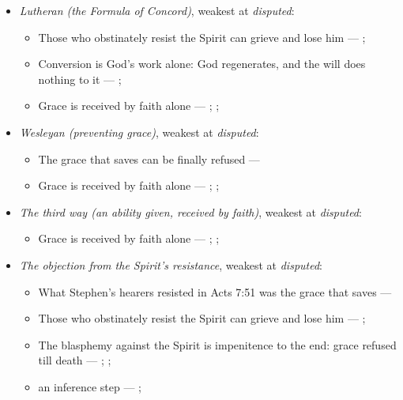 \documentclass[11pt]{article}
\begin{document}
\begin{itemize}
\begin{itemize}
\end{itemize}
\item \emph{Lutheran (the Formula of Concord)}, weakest at \emph{disputed}:
\begin{itemize}
\item Those who obstinately resist the Spirit can grieve and lose him --- \cite[Solid Declaration II.83]{concordia-triglotta-1921}; \cite[Solid Declaration XI.42]{concordia-triglotta-1921}
\item Conversion is God’s work alone: God regenerates, and the will does nothing to it --- \cite[Solid Declaration II.89]{concordia-triglotta-1921}; \cite[Solid Declaration II.90]{concordia-triglotta-1921}
\item Grace is received by faith alone --- \cite[Augsburg Confession IV.1–3]{concordia-triglotta-1921}; \cite[Sermon 1, III.1]{wesley-sermons-1872}; \cite[Trent, Session VI (1547), canon 9]{tanner-decrees-1990}
\end{itemize}
\item \emph{Wesleyan (preventing grace)}, weakest at \emph{disputed}:
\begin{itemize}
\item The grace that saves can be finally refused --- \cite[397]{wesley-works-9-1827}
\item Grace is received by faith alone --- \cite[Augsburg Confession IV.1–3]{concordia-triglotta-1921}; \cite[Sermon 1, III.1]{wesley-sermons-1872}; \cite[Trent, Session VI (1547), canon 9]{tanner-decrees-1990}
\end{itemize}
\item \emph{The third way (an ability given, received by faith)}, weakest at \emph{disputed}:
\begin{itemize}
\item Grace is received by faith alone --- \cite[Augsburg Confession IV.1–3]{concordia-triglotta-1921}; \cite[Sermon 1, III.1]{wesley-sermons-1872}; \cite[Trent, Session VI (1547), canon 9]{tanner-decrees-1990}
\end{itemize}
\item \emph{The objection from the Spirit’s resistance}, weakest at \emph{disputed}:
\begin{itemize}
\item What Stephen’s hearers resisted in Acts 7:51 was the grace that saves --- \cite[Five Arminian Articles (1610), art. 4]{schaff-creeds-christendom-3-1977}
\item Those who obstinately resist the Spirit can grieve and lose him --- \cite[Solid Declaration II.83]{concordia-triglotta-1921}; \cite[Solid Declaration XI.42]{concordia-triglotta-1921}
\item The blasphemy against the Spirit is impenitence to the end: grace refused till death --- \cite[325]{npnf1-06-1888}; \cite[II-II q.14 a.1]{aquinas-summa-1920}; \cite[74]{calvin-harmony-evangelists-2-1845}
\item an inference step --- \cite[325]{npnf1-06-1888}; \cite[On Rebuke and Grace, ch. 43]{npnf1-05-1887}
\end{itemize}
\end{itemize}
\end{document}
